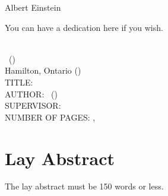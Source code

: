 \documentclass[
11pt, %
oneside, %
english, %
singlespacing, %
]{macthesis} %
\def\blankpage{%
      \clearpage%
      \thispagestyle{empty}%
      \addtocounter{page}{-1}%
      \null%
      \clearpage}
\begin{document}
\hfill\textemdash Albert Einstein

\blankpage
\clearpage



    You can have a dedication here if you wish.

\blankpage
\clearpage


\newpage
{} %
\setcounter{page}{2} %

\noindent %
\univname \\
\degreename\, (\the\year) \\
Hamilton, Ontario (\deptname) \\[1.5cm]
TITLE: \ttitle \\
AUTHOR: \authorname\,  %
(\univname)  \\
SUPERVISOR: \supname\, \\
NUMBER OF PAGES: \pageref{lastoffront}, \pageref{LastPage}  %

\clearpage

\section*{Lay Abstract}
  The lay abstract must be 150 words or less.
\end{document}
